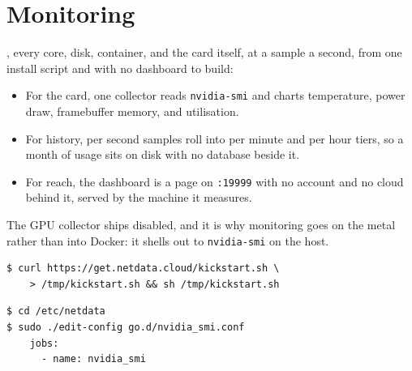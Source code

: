 
\clearpage
\section{Monitoring}

, every core, disk, container, and the card
itself, at a sample a second, from one install script and with no dashboard to
build\cite{netdataDocs}:

\begin{itemize}[topsep=0.25em, itemsep=0.4em, parsep=0em]
    \item For the card, one collector reads \texttt{nvidia-smi} and charts
    temperature, power draw, framebuffer memory, and utilisation.
    \item For history, per second samples roll into per minute and per hour
    tiers, so a month of usage sits on disk with no database beside it.
    \item For reach, the dashboard is a page on \texttt{:19999} with no account
    and no cloud behind it, served by the machine it measures.
\end{itemize}


 The GPU collector ships disabled,
and it is why monitoring goes on the metal rather than into Docker: it shells out
to \texttt{nvidia-smi} on the host.

\begin{verbatim}
$ curl https://get.netdata.cloud/kickstart.sh \
    > /tmp/kickstart.sh && sh /tmp/kickstart.sh
\end{verbatim}

\begin{verbatim}
$ cd /etc/netdata
$ sudo ./edit-config go.d/nvidia_smi.conf
    jobs:
      - name: nvidia_smi
\end{verbatim}

